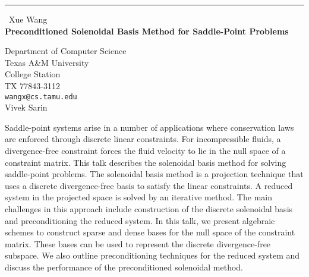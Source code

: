\documentclass{report}
\begin{document}
\begin{center}
\rule{6in}{1pt} \
{\large Xue Wang \\
{\bf Preconditioned Solenoidal Basis Method for Saddle-Point Problems}}

Department of Computer Science \\ Texas A\&M University \\ College Station \\ TX 77843-3112
\\
{\tt wangx@cs.tamu.edu}\\
Vivek Sarin\end{center}

Saddle-point systems arise in a number of applications where conservation
laws are enforced through discrete linear constraints. For incompressible
fluids, a divergence-free constraint forces the fluid velocity to lie in
the null space of a constraint matrix. This talk describes the solenoidal
basis method for solving saddle-point problems. The solenoidal basis
method is a projection technique that uses a discrete divergence-free
basis to satisfy the linear constraints. A reduced system in the
projected space is solved by an iterative method. The main challenges in
this approach include construction of the discrete solenoidal basis and
preconditioning the reduced system. In this talk, we present algebraic
schemes to construct sparse and dense bases for the null space of the
constraint matrix. These bases can be used to represent the discrete
divergence-free subspace. We also outline preconditioning techniques for
the reduced system and discuss the performance of the preconditioned
solenoidal method.
\end{document}
